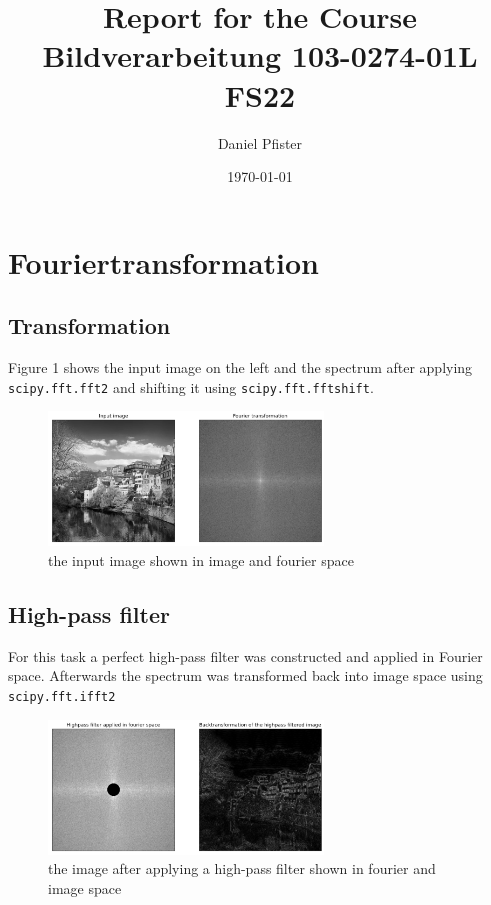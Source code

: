 \documentclass{article}
\title{Report for the Course Bildverarbeitung 103-0274-01L FS22}
\author{Daniel Pfister}
\date{\today}
\begin{document}
    \maketitle
    \section{Fouriertransformation}

    \subsection{Transformation}
    Figure 1 shows the input image on the left and the spectrum after applying \verb|scipy.fft.fft2| and shifting it using \verb|scipy.fft.fftshift|.
    \begin{figure}[H]
        \centering
        \includegraphics[width = 0.65\textwidth]{fft_1}
        \caption{the input image shown in image and fourier space}
        \label{fig:fft_1}
    \end{figure}

    \subsection{High-pass filter}
    For this task a perfect high-pass filter was constructed and applied in Fourier space.
    Afterwards the spectrum was transformed back into image space using \verb|scipy.fft.ifft2|
    \begin{figure}[H]
        \centering
        \includegraphics[width = 0.65\textwidth]{highpassfilter.png}
        \caption{the image after applying a high-pass filter shown in fourier and image space}
        \label{fig:highpassfilter}
    \end{figure}
\end{document}
